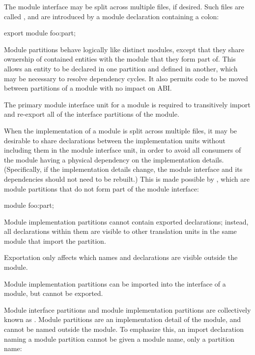 \pnum
The module interface may be split across multiple files,
if desired.
Such files are called , and are
introduced by a module declaration containing a colon:

\begin{codeblock}
export module foo:part;
\end{codeblock}

\pnum
Module partitions behave logically like distinct modules,
except that they share ownership of contained entities
with the module that they form part of.
This allows an entity to be declared in one partition
and defined in another,
which may be necessary to resolve
dependency cycles.
It also permits code to be moved between partitions of a module
with no impact on ABI.

\pnum
The primary module interface unit for a module is required
to transitively import and re-export all of the interface
partitions of the module.

\pnum
When the implementation of a module is split across multiple files,
it may be desirable to share declarations between the implementation units
without including them in the module interface unit,
in order to avoid all consumers of the module
having a physical dependency on the implementation details.
(Specifically, if the implementation details change,
the module interface and its dependencies should not need to be rebuilt.)
This is made possible by ,
which are module partitions that do not form part of the module interface:

\begin{codeblock}
module foo:part;
\end{codeblock}

\pnum
Module implementation partitions cannot contain exported declarations;
instead, all declarations within them are visible to other translation
units in the same module that import the partition.
\begin{note}
Exportation only affects which names and declarations are visible outside
the module.
\end{note}

\pnum
Module implementation partitions can be imported
into the interface of a module,
but cannot be exported.

\pnum
Module interface partitions and module implementation partitions
are collectively known as .
Module partitions are an implementation detail of the module,
and cannot be named outside the module.
To emphasize this, an import declaration naming a module partition
cannot be given a module name, only a partition name:

